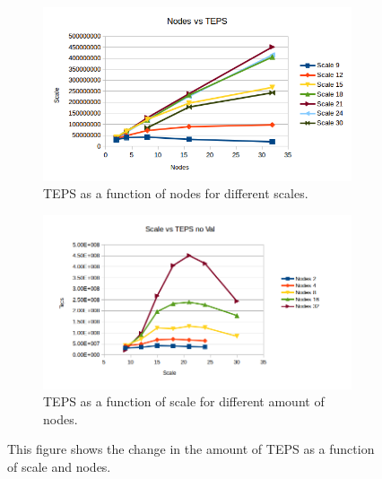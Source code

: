 \begin{figure}[!h]
\centering
\begin{subfigure}{.5\textwidth}
  \centering
  \includegraphics[width=\linewidth]{images/nodes_no_val.png}
  \caption{TEPS as a function of nodes for different scales.}
  \label{fig:nodes_no_val}
\end{subfigure}%
\begin{subfigure}{.5\textwidth}
  \centering
  \includegraphics[width=\linewidth]{images/scale_no_val.png}
  \caption{TEPS as a function of scale for different amount of nodes.}
  \label{fig:scale_no_val}
\end{subfigure}
\caption{This figure shows the change in the amount of TEPS as a function of scale and nodes.}
\label{fig:das_no_val}
\end{figure}

